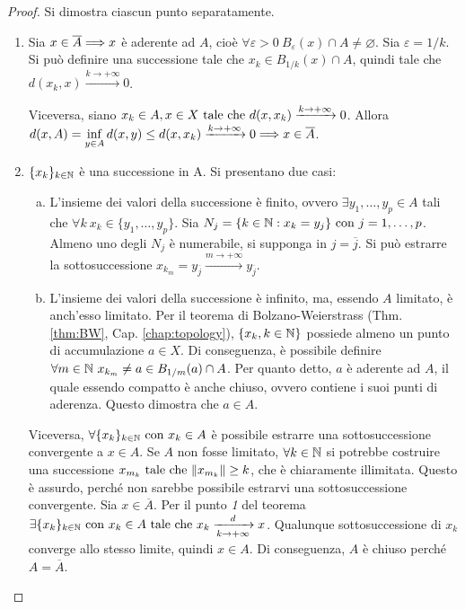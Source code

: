 \begin{proof}
    Si dimostra ciascun punto separatamente.
    \begin{enumerate}
        \item Sia $x \in \overline{A} \Longrightarrow x$ è aderente ad $A$, cioè $\forall \varepsilon > 0\ B_\varepsilon(x)\cap A \neq \varnothing$. Sia $\varepsilon=1/k$. Si può definire una successione tale che $x_k \in B_{1/k}(x)\cap A$, quindi tale che $d(x_k,x)\xrightarrow{k\to+\infty}0$.
                
        Viceversa, siano $x_k \in A, x \in X \text{ tale che } d(x,x_k)\xrightarrow{k\to+\infty}0$. Allora $d(x,A)=\inf\limits_{y\in A}d(x,y)\leq d(x,x_k)\xrightarrow{k\to+\infty}0\Longrightarrow x \in \overline{A}$.

        \item $\{x_k\}_{k\in\mathbb{N}}$ è una successione in A. Si presentano due casi:
        \begin{enumerate}[a.]
            \item L'insieme dei valori della successione è finito, ovvero $\exists y_1,\dots,y_p\in A$ tali che $\forall k \ x_k \in \{y_1,\dots,y_p\}$. Sia $N_j=\{k\in\mathbb{N}:x_k=y_j\} \text{ con } j=1,\dots,p$. Almeno uno degli $N_j$ è numerabile, si supponga in $j=\overline{j}$. Si può estrarre la sottosuccessione $x_{k_m}=y_{\overline{j}}\xrightarrow{m\to+\infty}y_{\overline{j}}$.
            \item L'insieme dei valori della successione è infinito, ma, essendo $A$ limitato, è anch'esso limitato. Per il teorema di Bolzano-Weierstrass (Thm. \ref{thm:BW}, Cap. \ref{chap:topology}), $\{x_k, k \in \mathbb{N}\}$ possiede almeno un punto di accumulazione $a \in X$. Di conseguenza, è possibile definire $\forall m \in \mathbb{N}\ x_{k_m}\neq a \in B_{1/m}(a)\cap A$. Per quanto detto, $a$ è aderente ad $A$, il quale essendo compatto è anche chiuso, ovvero contiene i suoi punti di aderenza. Questo dimostra che $a \in A$.
        \end{enumerate}
        
        Viceversa, $\forall \{x_k\}_{k\in\mathbb{N}} \text{ con } x_k \in A$ è possibile estrarre una sottosuccessione convergente a $x \in A$. Se $A$ non fosse limitato, $\forall k \in \mathbb{N}$ si potrebbe costruire una successione $x_{m_k} \text{ tale che } \norm{x_{m_k}}\geq k$, che è chiaramente illimitata. Questo è assurdo, perché non sarebbe possibile estrarvi una sottosuccessione convergente. Sia $x \in \overline{A}$. Per il punto \textit{1} del teorema $\exists \{x_k\}_{k\in\mathbb{N}} \text{ con } x_k \in A \text{ tale che } x_k\xrightarrow[k\to+\infty]{d}x$. Qualunque sottosuccessione di $x_k$ converge allo stesso limite, quindi $x \in A$. Di conseguenza, $A$ è chiuso perché $A=\overline{A}$.
    \end{enumerate}
\end{proof}

